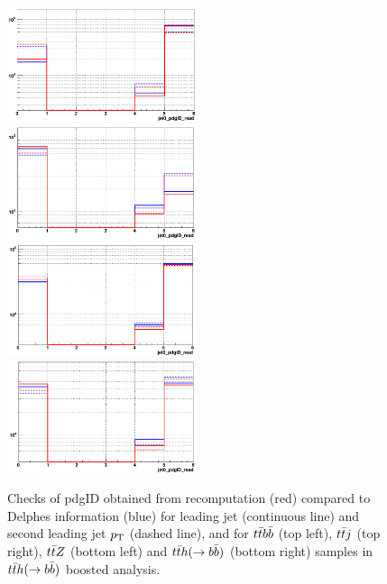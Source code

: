 \documentclass{cernrep}
\begin{document}
\begin{figure}[!htb]\centering
\includegraphics[width=0.495\textwidth]{Fig/Zptt/check_TRF/tth_boosted/jet12pdgID_ttbb_redModule_blueDELPHES.png}
\includegraphics[width=0.495\textwidth]{Fig/Zptt/check_TRF/tth_boosted/jet12pdgID_ttj_redModule_blueDELPHES.png}
\includegraphics[width=0.495\textwidth]{Fig/Zptt/check_TRF/tth_boosted/jet12pdgID_ttz_redModule_blueDELPHES.png}
\includegraphics[width=0.495\textwidth]{Fig/Zptt/check_TRF/tth_boosted/jet12pdgID_tth_redModule_blueDELPHES.png}
\caption{Checks of pdgID obtained from recomputation (red) compared to Delphes information (blue) for leading jet (continuous line) and second leading jet $p\sb{\scriptstyle\mathrm{T}}$ (dashed line), and for $t\bar{t}b\bar{b}$ (top left), $t\bar{t}j$ (top right), $t\bar{t}Z$ (bottom left) and $t\bar{t}h(\rightarrow b\bar{b})$ (bottom right) samples in $t\bar{t}h(\rightarrow b\bar{b})$ boosted analysis.}
\label{fig:tthboosted_TRFchecks1}
\end{figure}
\end{document}
